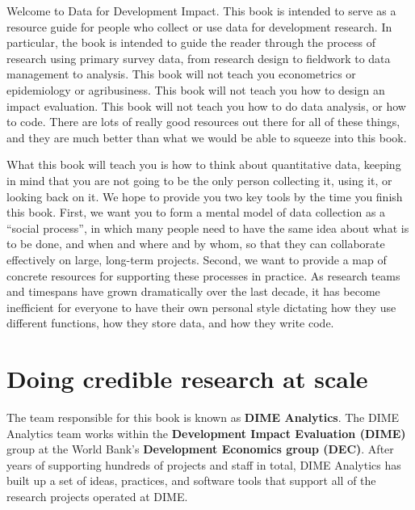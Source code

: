\begin{fullwidth}
Welcome to Data for Development Impact.
This book is intended to serve as a resource guide
for people who collect or use data for development research.
In particular, the book is intended to guide the reader
through the process of research using primary survey data,
from research design to fieldwork to data management to analysis.
This book will not teach you econometrics or epidemiology or agribusiness.
This book will not teach you how to design an impact evaluation.
This book will not teach you how to do data analysis, or how to code.
There are lots of really good resources out there for all of these things,
and they are much better than what we would be able to squeeze into this book.

What this book will teach you is how to think about quantitative data,
keeping in mind that you are not going to be the only person
collecting it, using it, or looking back on it.
We hope to provide you two key tools by the time you finish this book.
First, we want you to form a mental model of data collection as a ``social process'',
in which many people need to have the same idea about what is to be done, and when and where and by whom,
so that they can collaborate effectively on large, long-term projects.
Second, we want to provide a map of concrete resources for supporting these processes in practice.
As research teams and timespans have grown dramatically over the last decade,
it has become inefficient for everyone to have their own personal style
dictating how they use different functions, how they store data, and how they write code.
\end{fullwidth}


\section{Doing credible research at scale}

The team responsible for this book is known as \textbf{DIME Analytics}.
The DIME Analytics team works within the \textbf{Development Impact Evaluation  (DIME)} group 
at the World Bank's \textbf{Development Economics group (DEC)}.
After years of supporting hundreds of projects and staff in total,
DIME Analytics has built up a set of ideas, practices, and software tools
that support all of the research projects operated at DIME.

